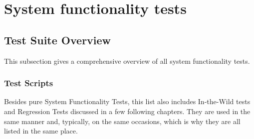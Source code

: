 %
%

\section{System functionality tests}
\label{s:functionality}

\subsection{Test Suite Overview}

This subsection gives a comprehensive overview of all system functionality tests.

\subsubsection{Test Scripts}

Besides pure System Functionality Tests, this list also includes In-the-Wild tests and Regression Tests discussed in a few following chapters. They are used in the same manner and, typically, on the same occasions, which is why they are all listed in the same place. 

